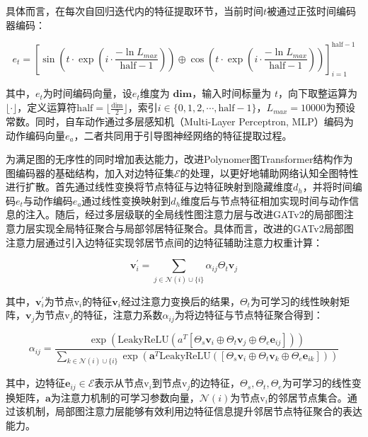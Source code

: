       具体而言，在每次自回归迭代内的特征提取环节，当前时间$t$被通过正弦时间编码器编码：

      \begin{equation}
        e_{t}=\left[\sin{(t\cdot \exp{(i\cdot\frac{-\ln L_{max}}{\text{half}-1})})} \oplus \cos{(t\cdot \exp{(i\cdot\frac{-\ln L_{max}}{\text{half}-1})})} \right]_{i=1}^{\text{half}-1}
      \end{equation}

      \noindent 其中，$e_t$为时间编码向量，设$e_t$维度为 $\boldsymbol{\text{dim}}$，输入时间标量为 $t$，向下取整运算为 $\lfloor \cdot \rfloor$，定义运算符$\text{half}=\lfloor \frac{\text{dim}}{2} \rfloor$，索引$i\in \{ 0,1,2,\cdots, \text{half}-1\}$，$L_{max}=10000$为预设常数。同时，自车动作通过多层感知机（Multi-Layer Perceptron, MLP）编码为动作编码向量$e_a$，二者共同用于引导图神经网络的特征提取过程。

      为满足图的无序性的同时增加表达能力，改进Polynomer\cite{Polynomer2024}图Transformer结构作为图编码器的基础结构，加入对边特征集$\mathcal{E}$的处理，以更好地辅助网络认知全图特性进行扩散。首先通过线性变换将节点特征与边特征映射到隐藏维度$d_h$，并将时间编码$e_t$与动作编码$e_a$通过线性变换映射到$d_h$维度后与节点特征相加实现时间与动作信息的注入。随后，经过多层级联的全局线性图注意力层与改进GATv2的局部图注意力层实现全局特征聚合与局部邻居特征聚合。具体而言，改进的GATv2局部图注意力层通过引入边特征实现邻居节点间的边特征辅助注意力权重计算：

      \begin{equation}
        \mathbf{v}_i^{\prime} = \sum_{j\in \mathcal{N}(i)\cup \{i\}} \alpha_{ij}\Theta_t \mathbf{v}_j
      \end{equation}

      \noindent 其中，$\mathbf{v}_i^{\prime}$为节点$\mathrm{v}_i$的特征$\mathbf{v}_i$经过注意力变换后的结果，$\Theta_t$为可学习的线性映射矩阵，$\mathbf{v}_j$为节点$\mathrm{v}_j$的特征，注意力系数$\alpha_{ij}$为将边特征与节点特征聚合得到：

      \begin{equation}
        \alpha_{ij} = \frac{\exp{(\text{LeakyReLU}(a^T[\Theta_s \mathbf{v}_i \oplus \Theta_t \mathbf{v}_j \oplus \Theta_e \mathbf{e}_{ij}]))}}{\sum_{k\in \mathcal{N}(i)\cup \{i\}} \exp{(\mathbf{a}^T\text{LeakyReLU}([\Theta_s \mathbf{v}_i \oplus \Theta_t \mathbf{v}_k \oplus \Theta_e \mathbf{e}_{ik}]))}}
      \end{equation}
      
      \noindent 其中，边特征$\mathbf{e}_{ij} \in \mathcal{E}$表示从节点$\mathrm{v}_i$到节点$\mathrm{v}_j$的边特征，$\Theta_s, \Theta_t, \Theta_e$为可学习的线性变换矩阵，$\mathbf{a}$为注意力机制的可学习参数向量，$\mathcal{N}(i)$为节点$\mathrm{v}_i$的邻居节点集合。通过该机制，局部图注意力层能够有效利用边特征信息提升邻居节点特征聚合的表达能力。

